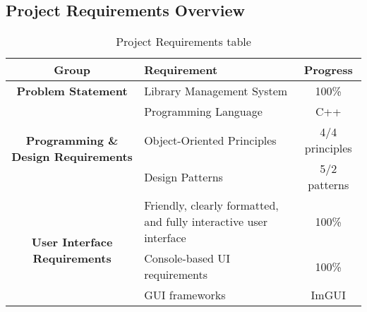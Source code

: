 \subsection*{Project Requirements Overview}
\begin{center}
	\begin{table}[H]
		\renewcommand{\arraystretch}{1.5}
		\setlength{\tabcolsep}{8pt}

		\begin{tabularx}{\textwidth}{| c | X | c |}
			\hline
			\rowcolor{gray!30}
			\textbf{Group} & \textbf{Requirement}                                              & \textbf{Progress} \\
			\hline

			\textbf{Problem Statement}
			               & Library Management System                                         & 100\%             \\
			\hline

			\multirow{3}{*}{\parbox{4cm}{\centering\textbf{Programming \& Design Requirements}}}
			               & Programming Language                                              & C++               \\
			\cline{2-3}
			               & Object-Oriented Principles                                        & 4/4 principles    \\
			\cline{2-3}
			               & Design Patterns                                                   & 5/2 patterns      \\
			\hline

			\multirow{3}{*}{\parbox{4cm}{\centering\textbf{User Interface Requirements}}}
			               & Friendly, clearly formatted, and fully interactive user interface & 100\%             \\
			\cline{2-3}
			               & Console-based UI requirements                                     & 100\%             \\
			\cline{2-3}
			               & GUI frameworks                                                    & ImGUI             \\
			\cline{2-3}
			\hline
		\end{tabularx}

		\caption{Project Requirements table}
	\end{table}
\end{center}


